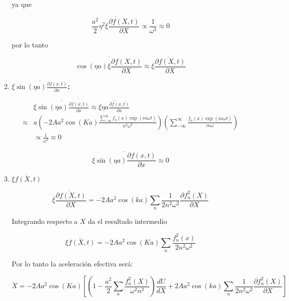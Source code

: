 \begin{enumerate}
ya que 

    \begin{equation}\label{eq:B.36}
        \overline{\frac{a^2}{2}\eta^2\xi\frac{\partial f(X,t)}{\partial X}} \propto \frac{1}{\omega^3} \approx 0
    \end{equation}

por lo tanto 

    \begin{equation}\label{eq:B.37}
            \overline{\cos(\eta a)\xi \frac{\partial f(X,t)}{\partial X}} \approx \overline{\xi\frac{\partial f(X,t)}{\partial X}}
    \end{equation}
    
\item  \textbf{ $\overline{\xi \sin(\eta a)\frac{\partial f(x,t)}{\partial x}}$:}

    \begin{equation}\label{eq:B.38}
        \begin{split}
            &\overline{\xi \sin(\eta a)\frac{\partial f(x,t)}{\partial x}} \approx  \overline{\xi \eta a\frac{ \partial f(x,t)}{\partial x}}\\
            \approx & a  (-2Aa^2\cos(Ka)\frac{\sum_{-\infty}^{\infty} f_n(x)\exp(i n\omega t)}{n^2\omega^2})(\sum^{\infty}_{-\infty}\frac{f_n(x)\exp(in\omega t)}{in\omega})\\& \propto \frac{1}{\omega^3} \approx 0
        \end{split}
    \end{equation}

\begin{equation}\label{eq:B.39}
    \overline{\xi \sin(\eta a)\frac{\partial f(x,t)}{\partial x}} \approx 0
\end{equation}


\item \textbf{ $\overline{\xi f(X,t)}$}

 \begin{equation}\label{eq:B.40}
        \overline{\xi \frac{\partial f(X,t)}{\partial X}}=-2Aa^2\cos(ka)\sum_n \frac{1}{2n^2\omega^2}\frac{\partial f_n^2(X)}{\partial X}
    \end{equation}

 Integrando respecto a $X$ da el resultado intermedio

    \begin{equation}\label{eq:B.41}
        \overline{\xi f(X,t)}=-2Aa^2\cos(Ka)\sum_n\frac{f_n^2(x)}{2n^2\omega^2}
    \end{equation}
 
 Por lo tanto la aceleración efectiva será:
 
 \begin{equation}\label{eq:B.42}
 \ddot{X}= -2Aa^2\cos(Ka)\left[\left(1-\frac{a^2}{2}\sum_n \frac{f_n^2(X)}{\omega^2n^2}\right)\frac{dU}{dX}+2Aa^2\cos(ka)\sum_n \frac{1}{2n^2\omega^2}\frac{\partial f_n^2(X)}{\partial X}\right]
 \end{equation}
\end{enumerate}

